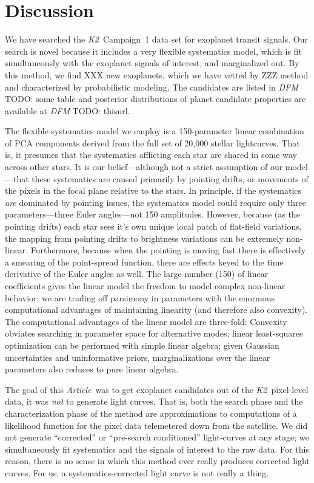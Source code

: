 \documentclass[12pt,preprint]{aastex}
\newcommand{\project}[1]{\textsl{#1}} %
\newcommand{\KT}{\project{K2}}
\newcommand{\paper}{\textsl{Article}}
\newcommand{\todo}[3]{{\color{#2} \emph{#1} TODO: #3}}
\newcommand{\dfmtodo}[1]{\todo{DFM}{red}{#1}}
\begin{document}
\section{Discussion}

We have searched the \KT\ Campaign~1 data set for exoplanet transit signals.
Our search is novel because it includes a very flexible systematics model,
which is fit simultaneously with the exoplanet signals of interest, and
marginalized out.
By this method, we find XXX new exoplanets, which we have vetted by ZZZ
method and characterized by probabilistic modeling.
The candidates are listed in \dfmtodo{some table} and
posterior distributions of planet candidate properties are available at
\dfmtodo{thisurl}.

The flexible systematics model we employ is a 150-parameter linear combination of PCA components
derived from the full set of 20,000 stellar lightcurves.
That is, it presumes that the systematics afflicting each star are shared in
some way across other stars.
It is our belief---although not a strict assumption of our model---that these
systematics are caused primarily by pointing drifts, or movements of the
pixels in the focal plane relative to the stars.
In principle, if the systematics \emph{are} dominated by pointing issues, the
systematics model could require only three parameters---three Euler
angles---not 150 amplitudes.
However, because (as the pointing drifts) each star sees it's own unique
local patch of flat-field variations, the mapping from pointing drifts to
brightness variations can be extremely non-linear.
Furthermore, because when the pointing is moving fast there is effectively
a smearing of the point-spread function, there are effects keyed to the
time derivative of the Euler angles as well.
The large number (150) of linear coefficients gives the linear model the
freedom to model complex non-linear behavior; we are trading off parsimony
in parameters with the enormous computational advantages of maintaining
linearity (and therefore also convexity).
The computational advantages of the linear model are three-fold:
Convexity obviates searching in parameter space for alternative modes;
linear least-squares optimization can be performed with simple linear algebra;
given Gaussian uncertainties and uninformative priors, marginalizations over
the linear parameters also reduces to pure linear algebra.

The goal of this \paper\ was to get exoplanet candidates out of the
\KT\ pixel-level data, it was \emph{not} to generate light curves.
That is, both the search phase and the characterization phase of the method
are approximations to computations of a likelihood function for the pixel
data telemetered down from the satellite.
We did not generate ``corrected'' or ``pre-search conditioned'' light-curves
at any stage; we simultaneously fit systematics and the signals of interest
to the raw data.
For this reason, there is no sense in which this method ever really
produces corrected light curves.
For us, a systematics-corrected light curve is not really a thing.
\end{document}
